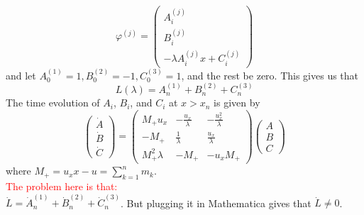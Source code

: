 \documentclass[english,master]{liumaiex}
\theoremstyle{plain}
\theoremstyle{definition}
\newcommand\todo[1]{\textcolor{red}{#1}}
\begin{document}
\begin{equation}
\varphi^{(j)} = 
\begin{pmatrix} A_i^{(j)} \\ B_i^{(j)} \\ -\lambda A_i^{(j)}x + C_i^{(j)} \end{pmatrix} 
\end{equation}
and let $A_0^{(1)} = 1, B_0^{(2)} = -1, C_0^{(3)} = 1$, and the rest be zero. This gives us that
\begin{equation}
	L(\lambda) = A_n^{(1)} + B_n^{(2)} + C_n^{(3)}
\end{equation}
The time evolution of $A_i$, $B_i$, and $C_i$ at $x > x_n$ is given by
\begin{equation}
\begin{pmatrix} \dot{A} \\ \dot{B} \\ \dot{C} \end{pmatrix} =
\begin{pmatrix}
	M_+ u_x & -\frac{u_x}{\lambda} & -\frac{u_x^2}{\lambda} \\
	-M_+ & \frac{1}{\lambda} & \frac{u_x}{\lambda} \\
	M_+^2 \lambda & -M_+ & -u_x M_+
\end{pmatrix}
\begin{pmatrix} A \\ B \\ C \end{pmatrix}
\end{equation}
where $M_+ = u_x x - u = \sum_{k=1}^n m_k$.
\\
\todo{The problem here is that:}\\
$\dot{L} = \dot{A}_n^{(1)} + \dot{B}_n^{(2)} + \dot{C}_n^{(3)}$. But plugging it in Mathematica gives that $\dot{L} \neq 0$.

%
%




%
%


\end{document}
